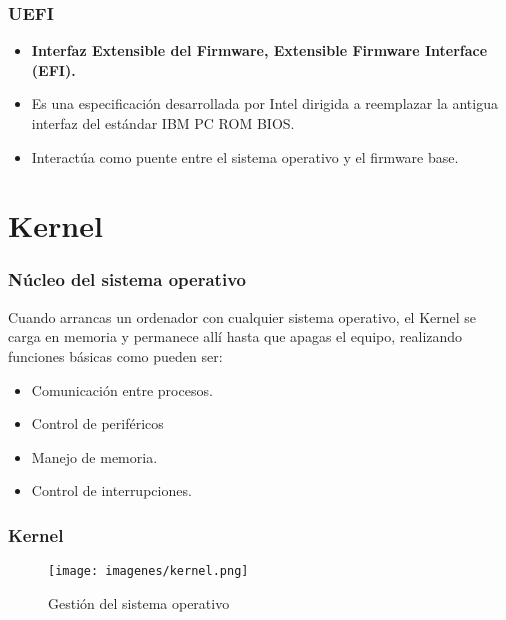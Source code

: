 \documentclass{beamer}
\begin{document}
\begin{frame}[fragile]
\frametitle{UEFI}
\begin{itemize}[<+->]
\item \textbf{Interfaz Extensible del Firmware, Extensible Firmware Interface (EFI).}
\item Es una especificación desarrollada por Intel dirigida a reemplazar la antigua interfaz del estándar IBM PC ROM BIOS.
\item Interactúa como puente entre el sistema operativo y el firmware base.
\end{itemize}
\end{frame}

\section{Kernel} 

\begin{frame}
\frametitle{Núcleo del sistema operativo}
Cuando arrancas un ordenador con cualquier sistema operativo, el Kernel se carga en memoria y permanece allí hasta que apagas el equipo, realizando funciones básicas como pueden ser:\pause
\begin{itemize}[<+->]
\item Comunicación entre procesos.
\item Control de periféricos
\item Manejo de memoria.
\item Control de interrupciones.
\end{itemize} 
\end{frame}

\begin{frame}
\frametitle{Kernel} 
\begin{figure}
\texttt{[image: imagenes/kernel.png]} 
\caption{Gestión del sistema operativo}
\end{figure} 
\end{frame}
\end{document}
